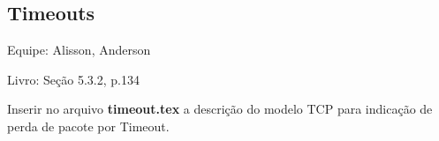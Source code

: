 \subsection{Timeouts}
Equipe: Alisson, Anderson

Livro: Seção 5.3.2, p.134

Inserir no arquivo \textbf{timeout.tex} a descrição do modelo TCP para indicação de perda de pacote por Timeout.

